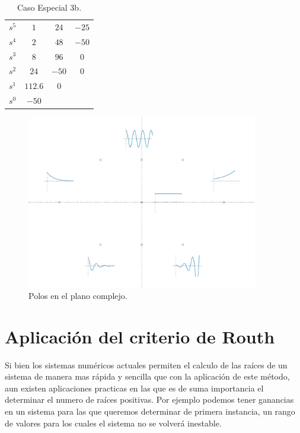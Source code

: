 \begin{enumerate}
            \begin{table}[htbp]
                \centering
                \begin{tabular}{c|c c c}
                $s^5$ & $1$ & $24$ & $-25$ \\
                $s^4$ & $2$ & $48$ & $-50$ \\
                $s^3$ & $8$ & $96$ & $0$   \\
                $s^2$ & $24$ & $-50$ & $0$ \\
                $s^1$ & $112.6$ & $0$ \\
                $s^0$ & $-50$
                \end{tabular}
                \caption{\label{tab:Caso3b}Caso Especial 3b.}
            \end{table}

        \end{enumerate}

        \begin{figure}
            \centering
            \includegraphics[width=0.9\textwidth]{./imagenes/planocomplejo.pdf}
            \caption{\label{fig:planocomplejo}Polos en el plano complejo.}
        \end{figure}


    \newpage
    \section{Aplicación del criterio de Routh}
        Si bien los sistemas numéricos actuales permiten el calculo de las raíces de un sistema de manera mas rápida y sencilla que con la aplicación de este método, aun existen aplicaciones practicas en las que es de suma importancia el determinar el numero de raíces positivas. Por ejemplo podemos tener ganancias en un sistema para las que queremos determinar de primera instancia, un rango de valores para los cuales el sistema no se volverá inestable.

